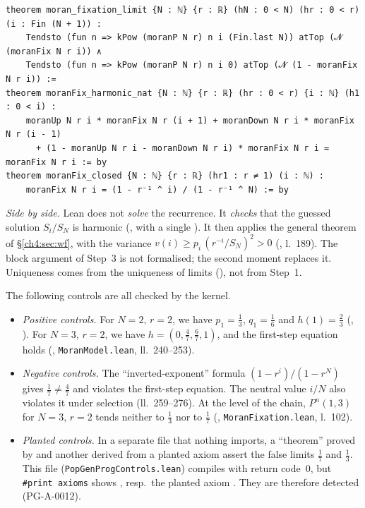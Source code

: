 \begin{leanbox}
\begin{lstlisting}[language=Lean]
theorem moran_fixation_limit {N : ℕ} {r : ℝ} (hN : 0 < N) (hr : 0 < r) (i : Fin (N + 1)) :
    Tendsto (fun n => kPow (moranP N r) n i (Fin.last N)) atTop (𝓝 (moranFix N r i)) ∧
    Tendsto (fun n => kPow (moranP N r) n i 0) atTop (𝓝 (1 - moranFix N r i)) :=
theorem moranFix_harmonic_nat {N : ℕ} {r : ℝ} (hr : 0 < r) {i : ℕ} (h1 : 0 < i) :
    moranUp N r i * moranFix N r (i + 1) + moranDown N r i * moranFix N r (i - 1)
      + (1 - moranUp N r i - moranDown N r i) * moranFix N r i = moranFix N r i := by
theorem moranFix_closed {N : ℕ} {r : ℝ} (hr1 : r ≠ 1) (i : ℕ) :
    moranFix N r i = (1 - r⁻¹ ^ i) / (1 - r⁻¹ ^ N) := by
\end{lstlisting}
\emph{Side by side.} Lean does not \emph{solve} the recurrence. It \emph{checks} that the guessed solution
$S_i/S_N$ is harmonic (, with a single ). It then applies the
general theorem  of §\ref{ch4:sec:wf}, with the variance
$v(i)\ge p_i\,(r^{-i}/S_N)^2>0$ (, l.~189). The block argument of Step~3 is not
formalised; the second moment replaces it. Uniqueness comes from the uniqueness of limits
(), not from Step~1.
\end{leanbox}

\begin{remark}\label{ch4:rem:moranctl}
The following controls are all checked by the kernel.
\begin{itemize}[itemsep=1pt]
\item \emph{Positive controls.} For $N=2$, $r=2$, we have $p_1=\frac13$, $q_1=\frac16$ and $h(1)=\frac23$
(, ). For $N=3$, $r=2$, we have $h=(0,\frac47,\frac67,1)$, and
the first-step equation holds (, \texttt{MoranModel.lean}, ll.~240--253).
\item \emph{Negative controls.} The ``inverted-exponent'' formula $(1-r^i)/(1-r^N)$ gives $\frac17\ne\frac47$
and violates the first-step equation. The neutral value $i/N$ also violates it under selection (ll.~259--276). At the level
of the chain, $P^n(1,3)$ for $N=3$, $r=2$ tends neither to $\frac13$ nor to $\frac17$
(, \texttt{MoranFixation.lean}, l.~102).
\item \emph{Planted controls.} In a separate file that nothing imports, a ``theorem'' proved by 
and another derived from a planted axiom assert the false limits $\frac17$ and $\frac13$. This file
(\texttt{PopGenProgControls.lean}) compiles with return code~$0$, but \texttt{\#print axioms} shows , resp.\ the planted axiom
. They are therefore detected (PG-A-0012).
\end{itemize}
\end{remark}

